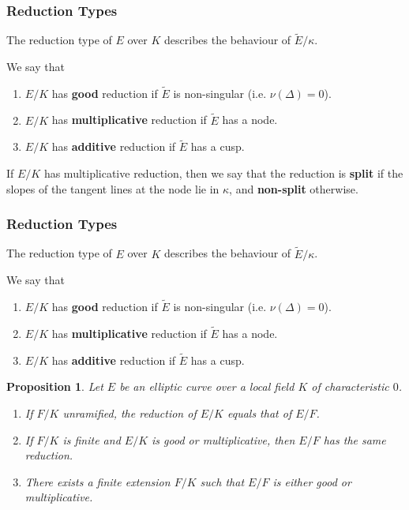 \documentclass{beamer}
\theoremstyle{plain}
\newtheorem{proposition}[thm]{Proposition}
\begin{document}
\begin{frame}
    \frametitle{Reduction Types}
    The reduction type of $E$ over $K$ describes the behaviour of $\tilde{E}/\kappa$. \pause
    \begin{definition}
        We say that
        \begin{enumerate}%
            \item $E/K$ has \textbf{good} reduction if $\tilde{E}$ is non-singular (i.e. $\nu(\Delta)=0$). \pause
            \item $E/K$ has \textbf{multiplicative} reduction if $\tilde{E}$ has a node. \pause
            \item $E/K$ has \textbf{additive} reduction if $\tilde{E}$ has a cusp.\pause
        \end{enumerate}
        If $E/K$ has multiplicative reduction, then we say that the reduction is \textbf{split} if the slopes of the tangent lines at the node lie in $\kappa$, and \textbf{non-split} otherwise.
    \end{definition}

\end{frame}

\iffalse
\begin{frame}
    \frametitle{Reduction Types}
    The reduction type of $E$ over $K$ describes the behaviour of $\tilde{E}/\kappa$.
    \begin{definition}
        We say that
        \begin{enumerate}%
            \item $E/K$ has \textbf{good} reduction if $\tilde{E}$ is non-singular (i.e. $\nu(\Delta)=0$).
            \item $E/K$ has \textbf{multiplicative} reduction if $\tilde{E}$ has a node.
            \item $E/K$ has \textbf{additive} reduction if $\tilde{E}$ has a cusp.
        \end{enumerate}
    \end{definition}
    \begin{proposition}
        Let $E$ be an elliptic curve over a local field $K$ of characteristic $0$. 
        \begin{enumerate}
            \item If $F/K$ unramified, the reduction of $E/K$ equals that of $E/F$.
            \item If $F/K$ is finite and $E/K$ is good or multiplicative, then $E/F$ has the same reduction.
            \item There exists a finite extension $F/K$ such that $E/F$ is either good or multiplicative.
        \end{enumerate}
    \end{proposition}
\end{frame}
\end{document}
